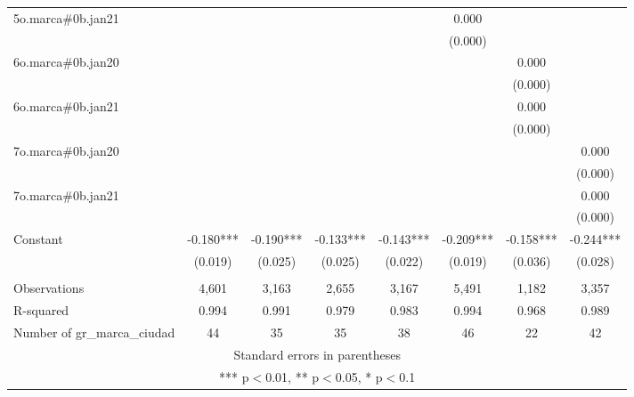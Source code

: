 \begin{tabular}{lccccccc}
5o.marca\#0b.jan21 &  &  &  &  & 0.000 &  &  \\
 &  &  &  &  & (0.000) &  &  \\
6o.marca\#0b.jan20 &  &  &  &  &  & 0.000 &  \\
 &  &  &  &  &  & (0.000) &  \\
6o.marca\#0b.jan21 &  &  &  &  &  & 0.000 &  \\
 &  &  &  &  &  & (0.000) &  \\
7o.marca\#0b.jan20 &  &  &  &  &  &  & 0.000 \\
 &  &  &  &  &  &  & (0.000) \\
7o.marca\#0b.jan21 &  &  &  &  &  &  & 0.000 \\
 &  &  &  &  &  &  & (0.000) \\
Constant & -0.180*** & -0.190*** & -0.133*** & -0.143*** & -0.209*** & -0.158*** & -0.244*** \\
 & (0.019) & (0.025) & (0.025) & (0.022) & (0.019) & (0.036) & (0.028) \\
 &  &  &  &  &  &  &  \\
Observations & 4,601 & 3,163 & 2,655 & 3,167 & 5,491 & 1,182 & 3,357 \\
R-squared & 0.994 & 0.991 & 0.979 & 0.983 & 0.994 & 0.968 & 0.989 \\
 Number of gr\_marca\_ciudad & 44 & 35 & 35 & 38 & 46 & 22 & 42 \\ \hline
\multicolumn{8}{c}{ Standard errors in parentheses} \\
\multicolumn{8}{c}{ *** p$<$0.01, ** p$<$0.05, * p$<$0.1} \\
\end{tabular}

